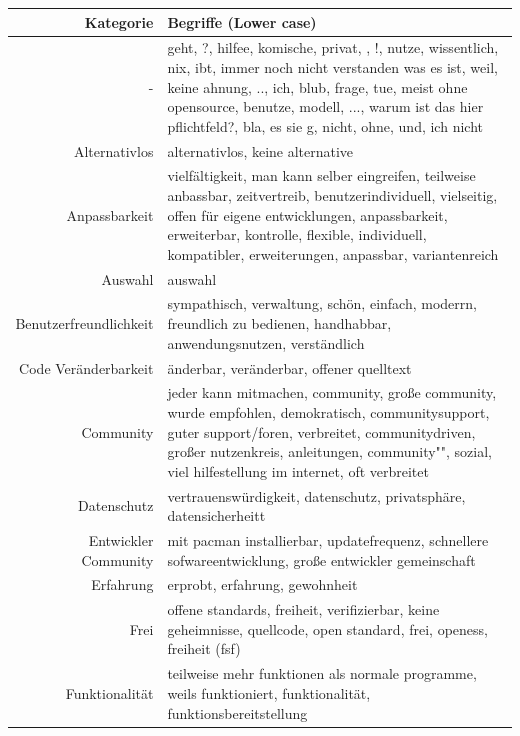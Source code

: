 \documentclass[a4paper]{article}
\begin{document}
            \begin{table}[!htbp]
                \begin{tabularx}{\textwidth}{rX}
                    Kategorie & Begriffe (Lower case) \\
                    \hline
                    - & \tiny geht, ?, hilfee, komische, privat, , !, nutze, wissentlich, nix, ibt, immer noch nicht verstanden was es ist, weil, keine ahnung, .., ich, blub, frage, tue, meist ohne opensource, benutze, modell, ..., warum ist das hier pflichtfeld?, bla, es sie g, nicht, ohne, und, ich nicht\\
                    Alternativlos & \tiny alternativlos, keine alternative\\
                    Anpassbarkeit & \tiny vielfältigkeit, man kann selber eingreifen, teilweise anbassbar, zeitvertreib, benutzerindividuell, vielseitig, offen für eigene entwicklungen, anpassbarkeit, erweiterbar, kontrolle, flexible, individuell, kompatibler, erweiterungen, anpassbar, variantenreich\\
                    Auswahl & \tiny auswahl\\
                    Benutzerfreundlichkeit & \tiny sympathisch, verwaltung, schön, einfach, moderrn, freundlich zu bedienen, handhabbar, anwendungsnutzen, verständlich\\
                    Code Veränderbarkeit & \tiny änderbar, veränderbar, offener quelltext\\
                    Community & \tiny jeder kann mitmachen, community, große community, wurde empfohlen, demokratisch, communitysupport, guter support/foren, verbreitet, communitydriven, großer nutzenkreis, anleitungen, community"", sozial, viel hilfestellung im internet, oft verbreitet\\
                    Datenschutz & \tiny vertrauenswürdigkeit, datenschutz, privatsphäre, datensicherheitt\\
                    Entwickler Community & \tiny mit pacman installierbar, updatefrequenz, schnellere sofwareentwicklung, große entwickler gemeinschaft\\
                    Erfahrung & \tiny erprobt, erfahrung, gewohnheit\\
                    Frei & \tiny offene standards, freiheit, verifizierbar, keine geheimnisse, quellcode, open standard, frei, openess, freiheit (fsf)\\
                    Funktionalität & \tiny teilweise mehr funktionen als normale programme, weils funktioniert, funktionalität, funktionsbereitstellung\\

\end{tabularx}
\end{table}
\end{document}
